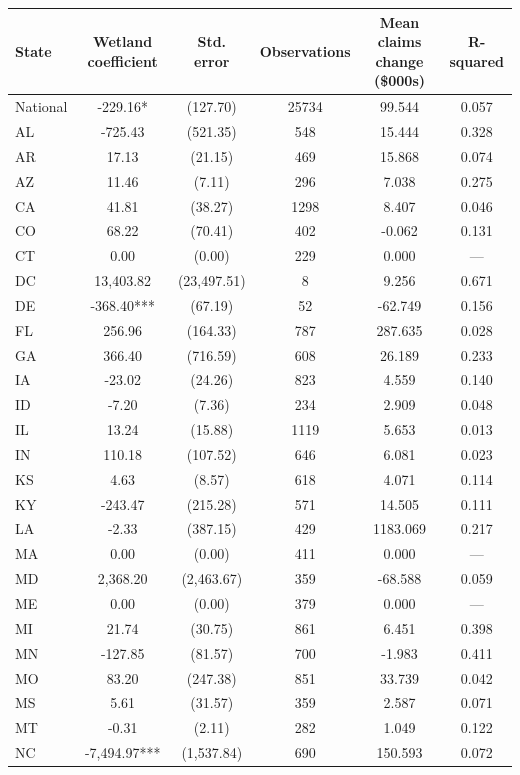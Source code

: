 
\begin{tabular}{lccccc}
\toprule
State & Wetland coefficient & Std. error & Observations & Mean claims change (\$000s) & R-squared\\
\midrule
National & -229.16* & (127.70) & 25734 & 99.544 & 0.057\\
AL & -725.43 & (521.35) & 548 & 15.444 & 0.328\\
AR & 17.13 & (21.15) & 469 & 15.868 & 0.074\\
AZ & 11.46 & (7.11) & 296 & 7.038 & 0.275\\
CA & 41.81 & (38.27) & 1298 & 8.407 & 0.046\\
\addlinespace
CO & 68.22 & (70.41) & 402 & -0.062 & 0.131\\
CT & 0.00 & (0.00) & 229 & 0.000 & —\\
DC & 13,403.82 & (23,497.51) & 8 & 9.256 & 0.671\\
DE & -368.40*** & (67.19) & 52 & -62.749 & 0.156\\
FL & 256.96 & (164.33) & 787 & 287.635 & 0.028\\
\addlinespace
GA & 366.40 & (716.59) & 608 & 26.189 & 0.233\\
IA & -23.02 & (24.26) & 823 & 4.559 & 0.140\\
ID & -7.20 & (7.36) & 234 & 2.909 & 0.048\\
IL & 13.24 & (15.88) & 1119 & 5.653 & 0.013\\
IN & 110.18 & (107.52) & 646 & 6.081 & 0.023\\
\addlinespace
KS & 4.63 & (8.57) & 618 & 4.071 & 0.114\\
KY & -243.47 & (215.28) & 571 & 14.505 & 0.111\\
LA & -2.33 & (387.15) & 429 & 1183.069 & 0.217\\
MA & 0.00 & (0.00) & 411 & 0.000 & —\\
MD & 2,368.20 & (2,463.67) & 359 & -68.588 & 0.059\\
\addlinespace
ME & 0.00 & (0.00) & 379 & 0.000 & —\\
MI & 21.74 & (30.75) & 861 & 6.451 & 0.398\\
MN & -127.85 & (81.57) & 700 & -1.983 & 0.411\\
MO & 83.20 & (247.38) & 851 & 33.739 & 0.042\\
MS & 5.61 & (31.57) & 359 & 2.587 & 0.071\\
\addlinespace
MT & -0.31 & (2.11) & 282 & 1.049 & 0.122\\
NC & -7,494.97*** & (1,537.84) & 690 & 150.593 & 0.072\\

\end{tabular}
